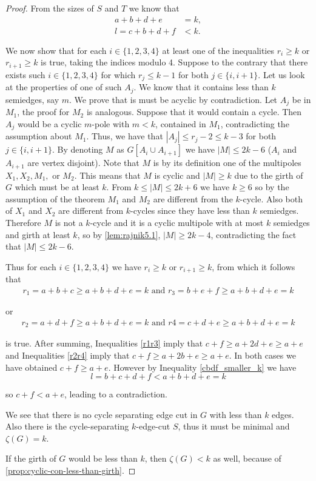 \documentclass[12pt, twoside]{book}
\begin{document}
\begin{proof}
	From the sizes of $S$ and $T$ we know that
	\begin{align}
		a+b+d+e &= k, \label{abde_eq_k}\\
		l=c+b+d+f &< k. \label{cbdf_smaller_k}
	\end{align}
	
	We now show that for each $i\in\{1,2,3,4\}$ at least one of the inequalities $r_i\geq k$ or $r_{i+1}\geq k$ is true, taking the indices modulo 4. Suppose to the contrary that there exists such $i\in\{1,2,3,4\}$ for which $r_j\leq k-1$ for both $j\in\{i, i+1\}$. Let us look at the properties of one of such $A_j$. We know that it contains less than $k$ semiedges, say $m$. We prove that is must be acyclic by contradiction. Let $A_j$ be in $M_1$, the proof for $M_2$ is analogous. Suppose that it would contain a cycle. Then $A_j$ would be a cyclic $m$-pole with $m<k$, contained in $M_1$, contradicting the assumption about $M_1$. Thus, we have that $|A_j|\leq r_j-2\leq k-3$ for both $j\in \{i, i+1\}$. By denoting $M$ as $G[A_i\cup A_{i+1}]$ we have $|M|\leq 2k-6$ ($A_i$ and $A_{i+1}$ are vertex disjoint). Note that $M$ is by its definition one of the multipoles $X_1, X_2, M_1,$ or $M_2$. This means that $M$ is cyclic and $|M|\geq k$ due to the girth of $G$ which must be at least $k$. From $k\leq |M|\leq 2k+6$ we have $k\geq 6$ so by the assumption of the theorem $M_1$ and $M_2$ are different from the $k$-cycle. Also both of $X_1$ and $X_2$ are different from $k$-cycles since they have less than $k$ semiedges. Therefore $M$ is not a $k$-cycle and it is a cyclic multipole with at most $k$ semiedges and girth at least $k$, so by \cref{lem:rajnik5.1}, $|M| \geq 2k - 4$, contradicting the fact that $|M|\leq 2k-6$.
	
	Thus for each $i\in\{1,2,3,4\}$ we have $r_i\geq k$ or $r_{i+1}\geq k$, from which it follows that
	\begin{align}
		r_1 =a+b+c\geq a+b+d+e=k \text{ and } r_3 =b+e+f \geq a+b+d+e=k\label{r1r3}
	\end{align}
	
	or
	\begin{align}
		r_2 =a+d+f \geq a+b+d+e=k \text{ and } r4 =c+d+e\geq a+b+d+e=k\label{r2r4}
	\end{align}
	
	is true. After summing, Inequalities \cref{r1r3} imply that $c+f\geq a+2d+e\geq a+e$ and Inequalities \cref{r2r4} imply that $c+f\geq a+2b+e\geq a+e$. In both cases we have obtained $c+f\geq a+e$. However by Inequality \cref{cbdf_smaller_k} we have 
	$$l=b+c+d+f<a+b+d+e=k$$
	
	so $c+f<a+e$, leading to a contradiction.
	
	We see that there is no cycle separating edge cut in $G$ with less than $k$ edges. Also there is the cycle-separating $k$-edge-cut $S$, thus it must be minimal and $\zeta(G)=k$.
	
	If the girth of $G$ would be less than $k$, then $\zeta(G)<k$ as well, because of \cref{prop:cyclic-con-less-than-girth}.
\end{proof}
\end{document}
